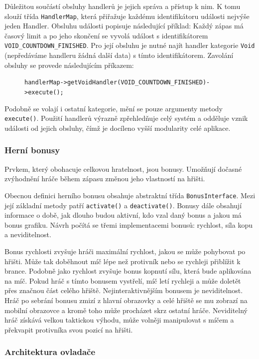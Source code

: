 \documentclass[thesis=B,czech,hidelinks]{FITthesis}[2012/06/26] %
\newcommand{\code}[1]{\texttt{#1}}
\begin{document}
Důležitou součástí obsluhy handlerů je jejich správa a přístup k nim. K tomu slouží třída \code{HandlerMap}, která přiřažuje každému identifikátoru události nejvýše jeden Handler. Obsluhu události popisuje následující příklad: Každý zápas má časový limit a po jeho skončení se vyvolá událost s identifikátorem \code{VOID\_COUNTDOWN\_FINISHED}. Pro její obsluhu je nutné najít handler kategorie \code{Void} (nepředáváme handleru žádná další data) s tímto identifikátorem. Zavolání obsluhy se provede následujícím příkazem: 

\begin{figure}[h!]
	\code{handlerMap->getVoidHandler(VOID\_COUNTDOWN\_FINISHED)->execute();}
\end{figure}

Podobně se volají i ostatní kategorie, mění se pouze argumenty metody \code{execute()}. Použití handlerů výrazně zpřehledňuje celý systém a odděluje vznik události od jejich obsluhy, čímž je docíleno vyšší modularity celé aplikace.

\subsubsection{Herní bonusy}

Prvkem, který obohacuje celkovou hratelnost, jsou bonusy. Umožňují dočasné zvýhodnění hráče během zápasu změnou jeho vlastností na hřišti. 

Obecnou definici herního bonusu obsahuje abstraktní třída \code{BonusInterface}. Mezi její základní metody patří \code{activate()} a \code{deactivate()}. Bonusy dále obsahují informace o době, jak dlouho budou aktivní, kdo vzal daný bonus a jakou má bonus grafiku. Návrh počítá se třemi implementacemi bonusů: rychlost, síla kopu a neviditelnost.

Bonus rychlosti zvyšuje hráči maximální rychlost, jakou se může pohybovat po hřišti. Může tak doběhnout míč lépe než protivník nebo se rychleji přiblížit k brance.
Podobně jako rychlost zvyšuje bonus kopnutí sílu, která bude aplikována na míč. Pokud hráč s tímto bonusem vystřelí, míč letí rychleji a může doletět přes značnou část celého hřiště.
Nejinteraktivnějším bonusem je neviditelnost. Hráč po sebrání bonusu zmizí z hlavní obrazovky a celé hřiště se mu zobrazí na mobilní obrazovce a kromě toho může procházet skrz ostatní hráče. Neviditelný hráč získává velkou taktickou výhodu, může volněji manipulovat s míčem a překvapit protivníka svou pozicí na hřišti.

\subsubsection{Architektura ovladače}
\end{document}

